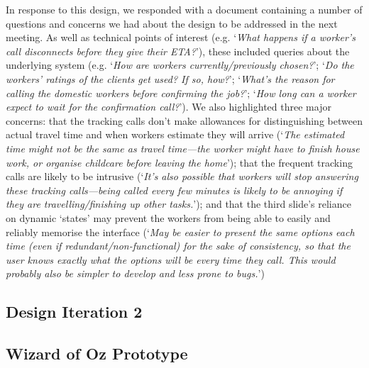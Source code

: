 In response to this design, we responded with a document containing a number of questions and concerns we had about the design to be addressed in the next meeting. As well as technical points of interest (e.g. `\textit{What happens if a worker's call disconnects before they give their ETA?}'), these included queries about the underlying system (e.g. `\textit{How are workers currently/previously chosen?}'; `\textit{Do the workers' ratings of the clients get used? If so, how?}'; `\textit{What's the reason for calling the domestic workers before confirming the job?}'; `\textit{How long can a worker expect to wait for the confirmation call?}'). We also highlighted three major concerns: that the tracking calls don't make allowances for distinguishing between actual travel time and when workers estimate they will arrive (`\textit{The estimated time might not be the same as travel time---the worker might have to finish house work, or organise childcare before leaving the home}'); that the frequent tracking calls are likely to be intrusive (`\textit{It’s also possible that workers will stop answering these tracking calls---being called every few minutes is likely to be annoying if they are travelling/finishing up other tasks.}'); and that the third slide's reliance on dynamic `states' may prevent the workers from being able to easily and reliably memorise the interface (`\textit{May be easier to present the same options each time (even if redundant/non-functional) for the sake of consistency, so that the user knows exactly what the options will be every time they call. This would probably also be simpler to develop and less prone to bugs.}') 



\subsection{Design Iteration 2}

\subsection{Wizard of Oz Prototype}

